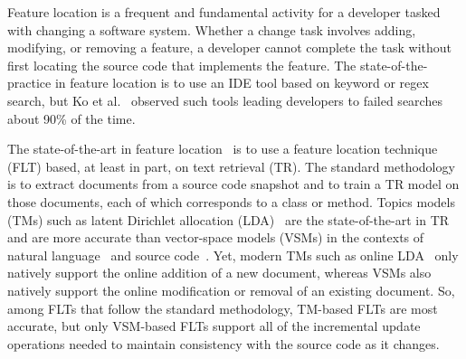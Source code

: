 
Feature location is a frequent and fundamental activity for a developer tasked with changing a software system.
Whether a change task involves adding, modifying, or removing a feature, a developer cannot complete the task without first locating the source code that implements the feature.
The state-of-the-practice in feature location is to use an IDE tool based on keyword or regex search, but Ko et al.~\cite{Ko-etal:2006} observed such tools leading developers to failed searches about 90\% of the time.

The state-of-the-art in feature location~\cite{Dit-etal:2011} is to use a feature location technique (FLT) based, at least in part, on text retrieval (TR).
The standard methodology~\cite{Marcus-etal:04} is to extract documents from a source code snapshot and to train a TR model on those documents, each of which corresponds to a class or method.
Topics models (TMs) such as latent Dirichlet allocation (LDA)~\cite{Blei-etal:03} are the state-of-the-art in TR~\cite{Blei:ACM:Communications} and are more accurate than vector-space models (VSMs) in the contexts of natural language~\cite{} and source code~\cite{}.
Yet, modern TMs such as online LDA~\cite{} only natively support the online addition of a new document, whereas VSMs also natively support the online modification or removal of an existing document.
So, among FLTs that follow the standard methodology, TM-based FLTs are most accurate, but only VSM-based FLTs support all of the incremental update operations needed to maintain consistency with the source code as it changes.

